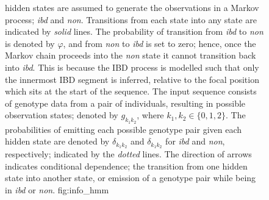 \begin{figure}[!htb]
%
{ hidden states are assumed to generate the observations in a Markov process; \emph{ibd} and \emph{non}.
Transitions from each state into any state are indicated by \emph{solid} lines.
The probability of transition from \emph{ibd} to \emph{non} is denoted by $\varphi$, and from \emph{non} to \emph{ibd} is set to zero; hence, once the Markov chain proceeds into the \emph{non} state it cannot transition back into \emph{ibd}.
This is because the IBD process is modelled such that only the innermost IBD segment is inferred, relative to the focal position which sits at the start of the sequence.
The input sequence consists of genotype data from a pair of individuals, resulting in  possible observation states; denoted by $g_{k_1 k_2}$, where ${k_1,k_2 \in \lbrace 0,1,2 \rbrace}$.
The probabilities of emitting each possible genotype pair given each hidden state are denoted by $\delta_{k_1 k_2}$ and $\delta_{k_1 k_2}$ for \emph{ibd} and \emph{non}, respectively; indicated by the \emph{dotted} lines.
The direction of arrows indicates conditional dependence; \ie the transition from one hidden state into another state, or emission of a genotype pair while being in \emph{ibd} or \emph{non}.}%
{fig:info_hmm}
\end{figure}
